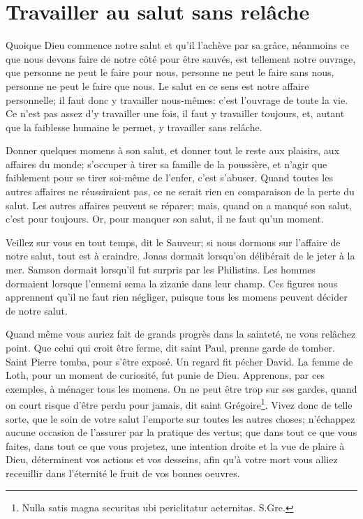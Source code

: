 \documentclass[instructions.tex]{subfiles}
\begin{document}
 
\chapter{Travailler au salut sans relâche}
 
Quoique Dieu commence notre salut et qu'il l'achève par sa grâce, néanmoins ce que nous devons faire de notre côté pour être sauvés, est tellement notre ouvrage, que personne ne peut le faire pour nous, personne ne peut le faire sans nous, personne ne peut le faire que nous. Le salut en ce sens est notre affaire personnelle; il faut donc y travailler nous-mêmes: c'est l'ouvrage de toute la vie. Ce n'est pas assez d'y travailler une fois, il faut y travailler toujours, et, autant que la faiblesse humaine le permet, y travailler sans relâche.

Donner quelques momens à son salut, et donner tout le reste aux plaisirs, aux affaires du monde; s'occuper à tirer sa famille de la poussière, et n'agir que faiblement pour se tirer soi-même de l'enfer, c'est s'abuser. Quand toutes les autres affaires ne réussiraient pas, ce ne serait rien en comparaison de la perte du salut. Les autres affaires peuvent se réparer; mais, quand on a manqué son salut, c'est pour toujours. Or, pour manquer son salut, il ne faut qu'un moment.

\og Veillez sur vous en tout temps\fg, dit le Sauveur; si nous dormons sur l'affaire de notre salut, tout est à craindre. Jonas dormait lorsqu'on délibérait de le jeter à la mer. Samson dormait lorsqu'il fut surpris par les Philistins. Les hommes dormaient lorsque l'ennemi sema la zizanie dans leur champ. Ces figures nous apprennent qu'il ne faut rien négliger, puisque tous les momens peuvent décider de notre salut.

Quand même vous auriez fait de grands progrès dans la sainteté, ne vous relâchez point. \og Que celui qui croit être ferme\fg, dit saint Paul, \og prenne garde de tomber\fg. Saint Pierre tomba, pour s'être exposé. Un regard fit pécher David. La femme de Loth, pour un moment de curiosité, fut punie de Dieu. Apprenons, par ces exemples, à ménager tous les momens. On ne peut être trop sur ses gardes, quand on court risque d'être perdu pour jamais, dit saint Grégoire\footnote{Nulla satis magna securitas ubi periclitatur aeternitas. S.Gre.}. Vivez donc de telle sorte, que le soin de votre salut l'emporte sur toutes les autres choses; n'échappez aucune occasion de l'assurer par la pratique des vertus; que dans tout ce que vous faites, dans tout ce que vous projetez, une intention droite et la vue de plaire à Dieu, déterminent vos actions et vos desseins, afin qu'à votre mort vous alliez receuillir dans l'éternité le fruit de vos bonnes oeuvres.
\end{document}
